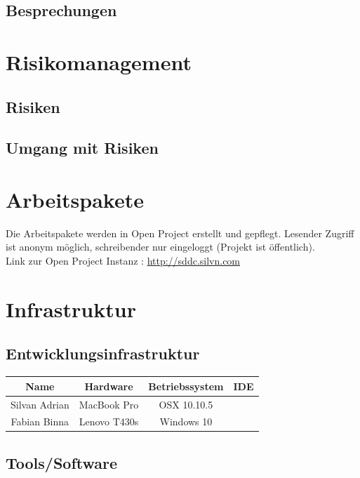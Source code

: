 \documentclass[11pt]{scrartcl}
\begin{document}
\subsection{Besprechungen}



\section{Risikomanagement}

\subsection{Risiken}



\subsection{Umgang mit Risiken}

\section{Arbeitspakete}

Die Arbeitspakete werden in Open Project erstellt und gepflegt.
Lesender Zugriff ist anonym möglich, schreibender nur eingeloggt (Projekt ist öffentlich). 
\\
Link zur Open Project Instanz : \href{http://sddc.silvn.com}{http://sddc.silvn.com}

\section{Infrastruktur}

\subsection{Entwicklungsinfrastruktur}

\begin{tabularx}{\textwidth}{c c c c}
\textbf{Name} & \textbf{Hardware} & \textbf{Betriebssystem} & \textbf{IDE} \\
\hline
Silvan Adrian & MacBook Pro & OSX 10.10.5 &  \\
\hline
Fabian Binna & Lenovo T430s & Windows 10 &  \\
\hline
\end{tabularx}

\subsection{Tools/Software}
\end{document}
